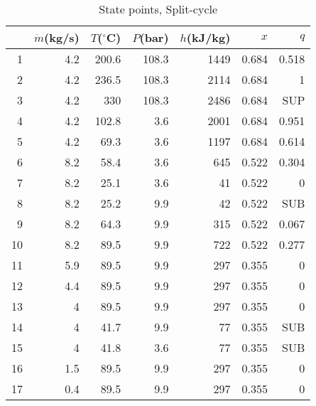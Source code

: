 \documentclass[review,3p]{elsarticle}
\begin{document}
\begin{table}[H]
\centering
\caption{State points, Split-cycle}
%
\scriptsize

\begin{tabular}{rrrrrrr}
\toprule
 & $\dot{m}$(kg/s)&  $T$($^{\circ}$C) &  $P$(bar) &  $h$(kJ/kg) & $x$ &  $q$ \\
 \midrule

 1 & 4.2 & 200.6 & 108.3 & 1449 & 0.684 & 0.518 \\

 2 & 4.2 & 236.5 & 108.3 & 2114 & 0.684 &  1 \\

 3 & 4.2 & 330 & 108.3 & 2486 & 0.684 & SUP \\

 4 & 4.2 & 102.8 & 3.6 & 2001 & 0.684 & 0.951 \\

 5 & 4.2 & 69.3 & 3.6 & 1197 & 0.684 & 0.614 \\

 6 & 8.2 & 58.4 & 3.6 & 645 & 0.522 & 0.304 \\

 7 & 8.2 & 25.1 & 3.6 & 41 & 0.522 &  0 \\

 8 & 8.2 & 25.2 & 9.9 & 42 & 0.522 & SUB \\

 9 & 8.2 & 64.3 & 9.9 & 315 & 0.522 & 0.067 \\

10 & 8.2 & 89.5 & 9.9 & 722 & 0.522 & 0.277 \\

11 & 5.9 & 89.5 & 9.9 & 297 & 0.355 &  0 \\

12 & 4.4 & 89.5 & 9.9 & 297 & 0.355 &  0 \\

13 &  4 & 89.5 & 9.9 & 297 & 0.355 &  0 \\

14 &  4 & 41.7 & 9.9 & 77 & 0.355 & SUB \\

15 &  4 & 41.8 & 3.6 & 77 & 0.355 & SUB \\

16 & 1.5 & 89.5 & 9.9 & 297 & 0.355 &  0 \\

17 & 0.4 & 89.5 & 9.9 & 297 & 0.355 &  0 \\


\end{tabular}
\end{table}
\end{document}
